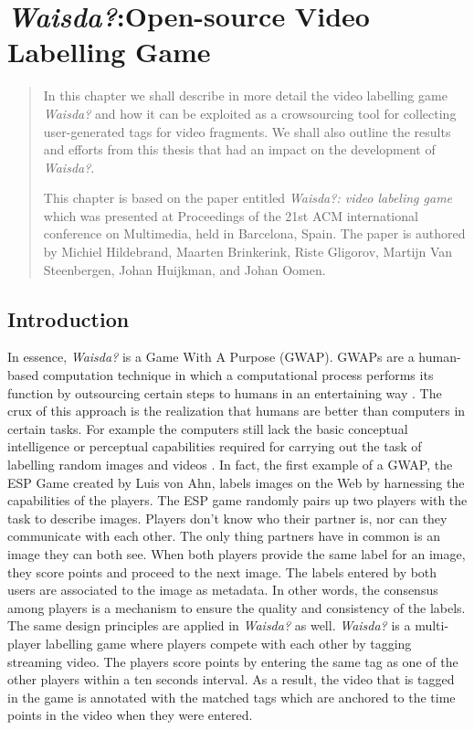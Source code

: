 \chapter{\textit{Waisda?}:Open-source Video Labelling Game}\label{chap:waisda}

\begin{quotation}
\noindent 
In this chapter we shall describe in more detail the video labelling game \textit{Waisda?} and how it can be exploited as a crowsourcing tool for collecting user-generated tags for video fragments. We shall also outline the results and efforts from this thesis that had an impact on the development of \textit{Waisda?}.

This chapter is based on the paper entitled \textit{Waisda?: video labeling game} which was presented at Proceedings of the 21st ACM international conference on Multimedia, held in Barcelona, Spain. The paper is authored by Michiel Hildebrand, Maarten Brinkerink, Riste Gligorov, Martijn Van Steenbergen, Johan Huijkman, and Johan Oomen.
\end{quotation}

\section{Introduction}

In essence, \textit{Waisda?} is a Game With A Purpose (GWAP). GWAPs are a human-based computation technique in which a computational process performs its function by outsourcing certain steps to humans in an entertaining way \cite{Ahn:2006:GP:1155311.1155342,gwap}. The crux of this approach is the realization that humans are better than computers in certain tasks. For example the computers still lack the basic conceptual intelligence or perceptual capabilities required for carrying out the task of labelling random images and videos \cite{Ahn:2006:GP:1155311.1155342}. In fact, the first example of a GWAP, the ESP Game created by Luis von Ahn, labels images on the Web by harnessing the capabilities of the players. The ESP game randomly pairs up two players with the task to describe images. Players don't know who their partner is, nor can
they communicate with each other. The only thing partners have in common is an image they can both see.
When both players provide the same label for an image, they score points and proceed to the next image. The labels entered by both users are associated to the image as metadata. In other words, the consensus among players is a mechanism to ensure the quality and consistency of the labels. The same design principles are applied in \textit{Waisda?} as well. \textit{Waisda?} is a multi-player labelling game where players compete with each other by tagging streaming video. The players score points by entering the same tag as one of the other players within a ten seconds interval. As a result, the video that is tagged in the game is annotated with the matched tags which are anchored to the time points in the video when they were entered.

